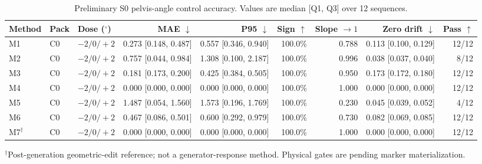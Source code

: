 \begin{table}[t]
\centering
\caption{Preliminary S0 pelvis-angle control accuracy. Values are median [Q1, Q3] over 12 sequences.}
\label{tab:s0_control_preliminary}
\begin{tabular}{lllrrrrrr}
\toprule
Method & Pack & Dose ($^\circ$) & MAE $\downarrow$ & P95 $\downarrow$ & Sign $\uparrow$ & Slope $\to1$ & Zero drift $\downarrow$ & Pass $\uparrow$ \\
\midrule
M1 & C0 & $-2/0/+2$ & 0.273 [0.148, 0.487] & 0.557 [0.346, 0.940] & 100.0\% & 0.788 & 0.113 [0.100, 0.129] & 12/12 \\
M2 & C0 & $-2/0/+2$ & 0.757 [0.044, 0.984] & 1.308 [0.100, 2.187] & 100.0\% & 0.996 & 0.038 [0.037, 0.040] & 8/12 \\
M3 & C0 & $-2/0/+2$ & 0.181 [0.173, 0.200] & 0.425 [0.384, 0.505] & 100.0\% & 0.950 & 0.173 [0.172, 0.180] & 12/12 \\
M4 & C0 & $-2/0/+2$ & 0.000 [0.000, 0.000] & 0.000 [0.000, 0.000] & 100.0\% & 1.000 & 0.000 [0.000, 0.000] & 12/12 \\
M5 & C0 & $-2/0/+2$ & 1.487 [0.054, 1.560] & 1.573 [0.196, 1.769] & 100.0\% & 0.230 & 0.045 [0.039, 0.052] & 4/12 \\
M6 & C0 & $-2/0/+2$ & 0.467 [0.086, 0.501] & 0.600 [0.292, 0.979] & 100.0\% & 0.730 & 0.082 [0.069, 0.085] & 12/12 \\
M7$^{\dagger}$ & C0 & $-2/0/+2$ & 0.000 [0.000, 0.000] & 0.000 [0.000, 0.000] & 100.0\% & 1.000 & 0.000 [0.000, 0.000] & 12/12 \\
\bottomrule
\end{tabular}
\begin{flushleft}\footnotesize $^{\dagger}$Post-generation geometric-edit reference; not a generator-response method. Physical gates are pending marker materialization.\end{flushleft}
\end{table}
